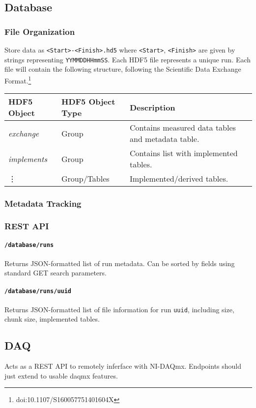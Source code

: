 \documentclass{article}
\begin{document}
\subsection{Database}
\subsubsection{File Organization}
Store data as \texttt{<Start>-<Finish>.hd5} where \texttt{<Start>}, \texttt{<Finish>} are given by strings representing \texttt{YYMMDDHHmmSS}.
Each HDF5 file represents a unique run.
Each file will contain the following structure, following the Scientific Data Exchange Format.\footnote{doi:10.1107/S160057751401604X}
\begin{center}
\begin{tabular}{l|ll}
	HDF5 Object	&	HDF5 Object Type	&	Description\\
	\hline
	\emph{exchange}	&	Group			&	Contains measured data tables and metadata table.
	\\
	\emph{implements}	& Group			&	Contains list with implemented tables.
	\\
	\vdots	&	Group/Tables	&	Implemented/derived tables.
\end{tabular}
\end{center}
\subsubsection{Metadata Tracking}
\subsubsection{REST API}


\paragraph{\texttt{/database/runs}} Returns JSON-formatted list of run metadata. Can be sorted by fields using standard GET search parameters.

\paragraph{\texttt{/database/runs/uuid}} Returns JSON-formatted list of file information for run \texttt{uuid}, including size, chunk size, implemented tables.
\subsection{DAQ}
Acts as a REST API to remotely inferface with NI-DAQmx. Endpoints should just extend to usable daqmx features.
\end{document}
